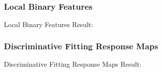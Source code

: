 \documentclass[mathserif]{beamer}%
\begin{document}
\subsubsection{Local Binary Features}
\label{ssub:LBF}
\begin{frame}[t]{Local Binary Features}
    Result:\\
\end{frame}
%
\subsubsection{Discriminative Fitting Response Maps}
\label{ssub:DFRM}
\begin{frame}[t]{Discriminative Fitting Response Maps}
    Result:\\
\end{frame}
%
\endPresentation%
%
%
%
\end{document}
